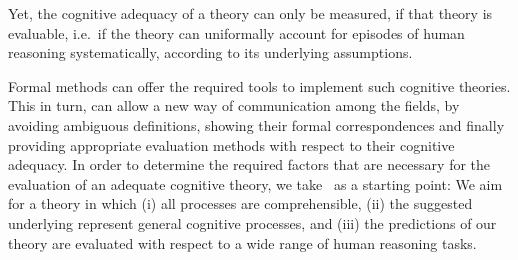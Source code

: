 \documentclass[12pt]{article}
\begin{document}
Yet, the cognitive adequacy of a theory can only be measured, if that theory is evaluable, i.e.\ if the theory can uniformally account for episodes of human reasoning systematically, according to its underlying assumptions. 

Formal methods can offer the required tools to implement such cognitive theories. This in turn, can allow a new way of communication among the fields, by avoiding ambiguous definitions, showing their formal correspondences and finally providing appropriate evaluation methods with respect to their cognitive adequacy. In order to determine the required factors that are necessary for the evaluation of an adequate cognitive theory, we take~\cite{ragni:stolzenburg:2015} as a starting point:
We aim for a theory in which (i) all processes are comprehensible, (ii) the suggested underlying represent general cognitive processes, and (iii) the predictions of our theory are evaluated with respect to a wide range of human reasoning tasks. 
\end{document}
